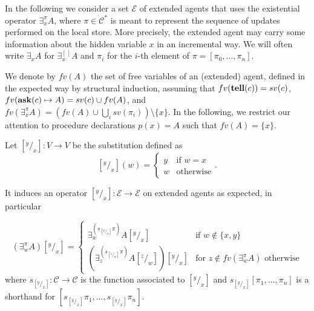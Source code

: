 \documentclass{llncs}
\newcommand{\tell}{{\bf tell}}
\newcommand{\ask}{{\bf ask}}
\newcommand{\ostop}{{\bf stop}}
\newcommand{\rarrow}{\rightarrow}
\begin{document}
In the following we consider 
a set $\mathcal{E}$ of extended agents that uses the existential operator $\exists^{\pi}_x A$, 
where $\pi \in {\mathcal C}^\ast$ is meant to represent the sequence of updates performed on the local store. 
More precisely, the extended agent may carry some information about the hidden variable 
$x$ in an incremental way. We will often write $\exists_x A$ for $\exists^{[ \,]}_x A$ and $\pi_i$ for 
the $i$-th element of $\pi = [ \pi_0, \ldots, \pi_n]$.

We denote by $fv(A)$ the set of free variables of an (extended) agent, defined in the expected way 
by structural induction, assuming that $fv(\tell(c)) = sv(c)$,
$fv(\ask(c) \mapsto A) = sv(c) \cup fv(A)$,
and $fv(\exists^{\pi}_x A) = (fv(A) \cup \bigcup_i sv(\pi_i)) \setminus \{x\}$.
%
In the following, we restrict our attention to 
procedure declarations $p(x) = A$ such that $fv(A) = \{x\}$.


\begin{definition}[Substitutions]
Let $[^y/_x]: V \to V$ be the substitution defined as
\[ [^y/_x](w) = 
		\begin{cases} 
			y & \text{if $w = x$} \\
            w & \text{otherwise}
        \end{cases}. \]

It induces an operator $[^y/_x]: \mathcal{E} \rarrow \mathcal{E}$ on extended agents as expected,  in particular

        $$(\exists^{\pi}_w A)[^y/_x] = \begin{cases} 
			\exists^{(s_{[^y/_x]} \pi)}_w A[^y/_x]  & \text{if } w \not \in \{x, y\} \\
             (\exists^{(s_{[^z/_w]} \pi)}_z A[^z/_w])[^y/_x] & \text{for } z \not \in fv(\exists^{\pi}_w A) \text{ otherwise}
        \end{cases}$$
where $s_{[^y/_x]}: {\mathcal C} \rightarrow {\mathcal C}$ is the function associated to $[^y/_x]$ and 
  $s_{[^y/_x]} [ \pi_1, \ldots, \pi_n ]$ is a shorthand for $[s_{[^y/_x]} \pi_1, \ldots, s_{[^y/_x]} \pi_n]$.
\end{definition}
\end{document}
